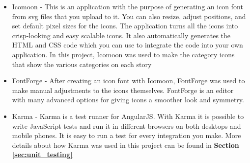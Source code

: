 \begin{itemize}
	\item Icomoon \cite{es4} - This is an application with the purpose of generating an icon font from svg files that you upload to it. You can also resize, adjust positions, and set default pixel sizes for the icons. The application turns all the icons into crisp-looking and easy scalable icons. It also automatically generates the HTML and CSS code which you can use to integrate the code into your own application. In this project, Icomoon was used to make the category icons that show the various categories on each story
	\item FontForge \cite{es5} - After creating an icon font with Icomoon, FontForge was used to make manual adjustments to the icons themselves. FontForge is an editor with many advanced options for giving icons a smoother look and symmetry.
	\item Karma \cite{KF3} - Karma is a test runner for AngularJS. With Karma it is possible to write JavaScript tests and run it in different browsers on both desktops and mobile phones. It is easy to run a test for every integration you make. More details about how Karma was used in this project can be found in \textbf{Section \ref{sec:unit_testing}}	
\end{itemize}


